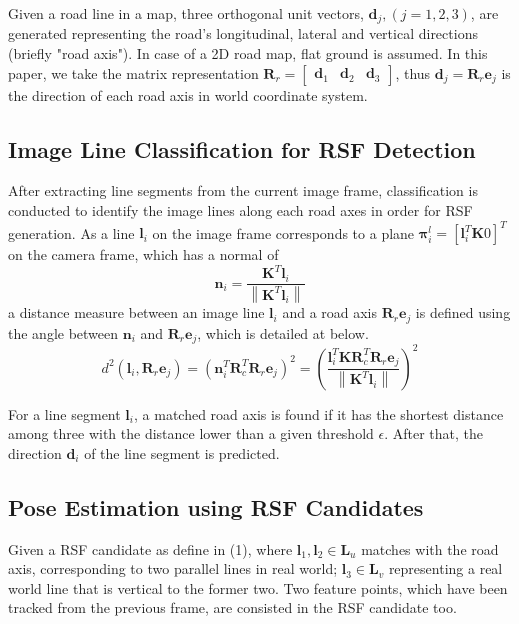 \documentclass[letterpaper, 10 pt, conference]{ieeeconf}  %
\begin{document}
Given a road line in a map, three orthogonal unit vectors, $\mathbf{d}_j, (j=1,2,3)$, are generated representing the road's longitudinal, lateral and vertical directions (briefly "road axis"). In case of a 2D road map, flat ground is assumed. In this paper, we take the matrix representation $\mathbf{R}_r = \begin{bmatrix} \mathbf{d}_1 & \mathbf{d}_2 & \mathbf{d}_3 \end{bmatrix}$, thus $\mathbf{d}_j = \mathbf{R}_r\mathbf{e}_j$ is the direction of each road axis in world coordinate system.

\subsection{Image Line Classification for RSF Detection}

After extracting line segments from the current image frame, classification is conducted to identify the image lines along each road axes in order for RSF generation.
As a line $\mathbf{l}_i$ on the image frame corresponds to a plane $\mathbf{\pi}_i^l = \left[\mathbf{l}_i^T\mathbf{K} 0\right]^T$ on the camera frame, which has a normal of
\begin{equation}
\mathbf{n}_i=\frac{\mathbf{K}^T\mathbf{l}_i}{\left\|\mathbf{K}^T\mathbf{l}_i\right\|}
\end{equation}
a distance measure between an image line $\mathbf{l}_i$ and a road axis $\mathbf{R}_r\mathbf{e}_j$ is defined using the angle between $\mathbf{n}_i$ and $\mathbf{R}_r\mathbf{e}_j$, which is detailed at below.
\begin{equation}
d^2(\mathbf{l}_i,\mathbf{R}_r\mathbf{e}_j) = {\left(\mathbf{n}_i^T\mathbf{R}_c^T\mathbf{R}_r\mathbf{e}_j\right)}^2 = { \left(\frac  {\mathbf{l}_i^T\mathbf{K}\mathbf{R}_c^T\mathbf{R}_r\mathbf{e}_j}
                {\left\|\mathbf{K}^T\mathbf{l}_i\right\|}
    \right)
  }^2
\label{eq:d_3d}
\end{equation}

For a line segment $\mathbf{l}_i$, a matched road axis is found if it has the shortest distance among three with the distance lower than a given threshold $\epsilon$. After that, the direction $\mathbf{d}_i$ of the line segment is predicted.

\subsection{Pose Estimation using RSF Candidates}
Given a RSF candidate as define in (1), where $\mathbf{l}_1,\mathbf{l}_2\in \mathbf{L}_u$ matches with the road axis, corresponding to two parallel lines in real world; $\mathbf{l}_3\in \mathbf{L}_v$ representing a real world line that is vertical to the former two. Two feature points, which have been tracked from the previous frame, are consisted in the RSF candidate too.
\end{document}
